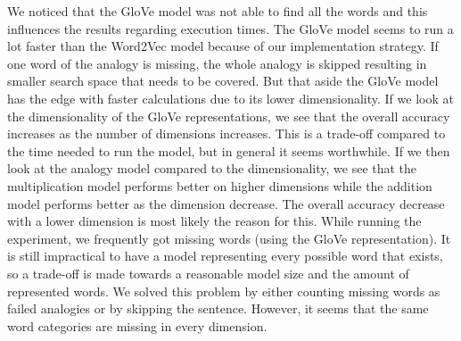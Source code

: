 We noticed that the GloVe model was not able to find all the words and this influences the results regarding execution times. The GloVe model seems to run a lot faster than the Word2Vec model because of our implementation strategy. If one word of the analogy is missing, the whole analogy is skipped resulting in smaller search space that needs to be covered. But that aside the GloVe model has the edge with faster calculations due to its lower dimensionality.
\newline
\newline
If we look at the dimensionality of the GloVe representations, we see that the overall accuracy increases as the number of dimensions increases. This is a trade-off compared to the time needed to run the model, but in general it seems worthwhile. 
If we then look at the analogy model compared to the dimensionality, we see that the multiplication model performs better on higher dimensions while the addition model performs better as the dimension decrease. The overall accuracy decrease with a lower dimension is most likely the reason for this.
\newline
\newline
While running the experiment, we frequently got missing words (using the GloVe representation). It is still impractical to have a model representing every possible word that exists, so a trade-off is made towards a reasonable model size and the amount of represented words. We solved this problem by either counting missing words as failed analogies or by skipping the sentence. However, it seems that the same word categories are missing in every dimension.

